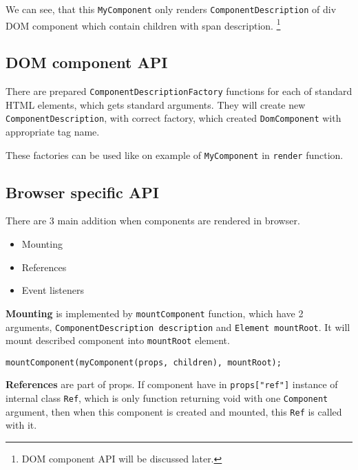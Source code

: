 \documentclass[oneside, 12pt]{book}
\begin{document}

    We can see, that this \texttt{MyComponent} only renders \texttt{ComponentDescription} of div DOM component which contain children with span description.
    \footnote{DOM component API will be discussed later.}

  \subsection{DOM component API}\label{subsec:our-api-dom}

    There are prepared \texttt{ComponentDescriptionFactory} functions for each of standard HTML elements, which gets standard arguments. 
    They will create new \texttt{ComponentDescription}, with correct factory, which created \texttt{DomComponent} with appropriate tag name.

    These factories can be used like on example of \texttt{MyComponent} in \texttt{render} function.

  \subsection{Browser specific API}\label{subsec:our-api-browser}
    
    There are 3 main addition when components are rendered in browser.
    \begin{itemize}
      \item Mounting
      \item References
      \item Event listeners
    \end{itemize}

    \textbf{Mounting} is implemented by \texttt{mountComponent} function, which have 2 arguments, 
    \texttt{ComponentDescription description} and \texttt{Element mountRoot}.
    It will mount described component into \texttt{mountRoot} element.
\begin{verbatim}
mountComponent(myComponent(props, children), mountRoot);
\end{verbatim}



    \textbf{References} are part of props. If component have in \texttt{props["ref"]} instance of internal class \texttt{{\textunderscore}Ref}, 
    which is only function returning void with one \texttt{Component} argument, then when this component is created and mounted, 
    this \texttt{{\textunderscore}Ref} is called with it. 
\end{document}

